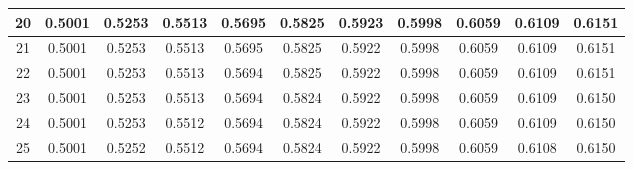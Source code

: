 \begin{tabular}{|c|c|c|c|c|c|c|c|c|c|c|}
 \hline 
20 &0.5001 &0.5253 &0.5513 &0.5695 &0.5825 &0.5923 &0.5998 &0.6059 &0.6109 &0.6151 \\
 \hline 
21 &0.5001 &0.5253 &0.5513 &0.5695 &0.5825 &0.5922 &0.5998 &0.6059 &0.6109 &0.6151 \\
 \hline 
22 &0.5001 &0.5253 &0.5513 &0.5694 &0.5825 &0.5922 &0.5998 &0.6059 &0.6109 &0.6151 \\
 \hline 
23 &0.5001 &0.5253 &0.5513 &0.5694 &0.5824 &0.5922 &0.5998 &0.6059 &0.6109 &0.6150 \\
 \hline 
24 &0.5001 &0.5253 &0.5512 &0.5694 &0.5824 &0.5922 &0.5998 &0.6059 &0.6109 &0.6150 \\
 \hline 
25 &0.5001 &0.5252 &0.5512 &0.5694 &0.5824 &0.5922 &0.5998 &0.6059 &0.6108 &0.6150 \\
 \hline 
\end{tabular}
